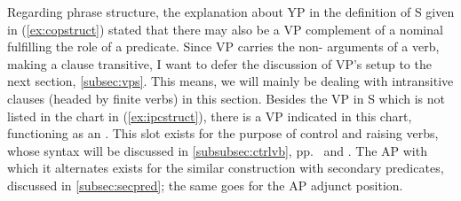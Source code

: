 Regarding phrase structure, the explanation about YP in the definition of S
given in (\ref{ex:copstruct}) stated that there may also be a VP complement of
a nominal fulfilling the role of a predicate. Since VP carries the non-\Subj{}
arguments of a verb, making a clause transitive, I want to defer the discussion
of VP's setup to the next section, \ref{subsec:vps}. This means, we will mainly
be dealing with intransitive clauses (headed by finite verbs) in this section.
Besides the VP in S which is not listed in the chart in (\ref{ex:ipcstruct}),
there is a VP indicated in this chart, functioning as an \XCompl{}. This slot
exists for the purpose of control and raising verbs, whose syntax will be
discussed in \autoref{subsubsec:ctrlvb}, pp.~\pageref{subsubsec:ctrlvb} and 
\pageref{subsubsec:raisvb}. The AP with which it alternates exists for the
similar construction with secondary predicates, discussed in 
\autoref{subsec:secpred}; the same goes for the AP adjunct position.

